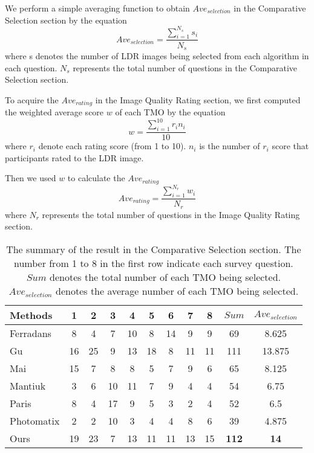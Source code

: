 \documentclass[journal]{IEEEtran}
\begin{document}
We perform a simple averaging function to obtain $Ave_{selection}$ in the Comparative Selection section by the equation
\begin{equation}
    Ave_{selection} = \frac{\sum_{i=1}^{N_s}s_i}{N_s}
\end{equation}
where s denotes the number of LDR images being selected from each algorithm in each question.  $N_s$ represents the total number of questions in the Comparative Selection section.

To acquire the $Ave_{rating}$ in the Image Quality Rating section, we first computed the weighted average score $w$ of each TMO by the equation
\begin{equation}
    w = \frac{\sum_{i=1}^{10}r_in_i}{10}
\end{equation}
where $r_i$ denote each rating score (from 1 to 10).  $n_i$ is the number of $r_i$ score that participants rated to the LDR image.

Then we used $w$ to calculate the $Ave_{rating}$ 
\begin{equation}
    Ave_{rating} = \frac{\sum_{i=1}^{N_r}w_i}{N_r}
\end{equation}
where $N_r$ represents the total number of questions in the Image Quality Rating section.

\begin{table*}[t]
\footnotesize
\begin{center}
\caption{The summary of the result in the Comparative Selection section. The number from 1 to 8 in the first row indicate each survey question.  $Sum$ denotes the total number of each TMO being selected.  $Ave_{selection}$ denotes the average number of each TMO being selected.}
\begin{tabular}{l|c|c|c|c|c|c|c|c|c|c}\hline
  Methods & 1 & 2 & 3 & 4 & 5 & 6 & 7 & 8 & $Sum$ & $Ave_{selection}$ \\ \hline
  Ferradans \cite{ferradans2011analysis} & 8 & 4 & 7 & 10 & 8 & 14 & 9 & 9 & 69 & 8.625 \\
   Gu \cite{gu2013local} & 16 & 25 & 9 & 13 & 18 & 8 & 11 & 11 & 111 & 13.875 \\
  Mai \cite{mai2011optimizing} & 15 & 7 & 8 & 8 & 5 & 7 & 9 & 6 & 65 & 8.125 \\
  Mantiuk \cite{mantiuk2008display} & 3 & 6 & 10 & 11 & 7 & 9 & 4 & 4 & 54 & 6.75 \\
  Paris \cite{paris2015local} & 8 & 4 & 17 & 9 & 5 & 3 & 2 & 4 & 52 & 6.5 \\
  Photomatix \cite{photomatrix} & 2 & 2 & 10 & 3 & 4 & 4 & 8 & 6 & 39 & 4.875 \\
  Ours & 19 & 23 & 7 & 13 & 11 & 11 & 13 & 15 & \textbf{112} & \textbf{14} \\
  \hline
\end{tabular}
\label{table:survey_1}
\end{center}
\end{table*}
\end{document}
